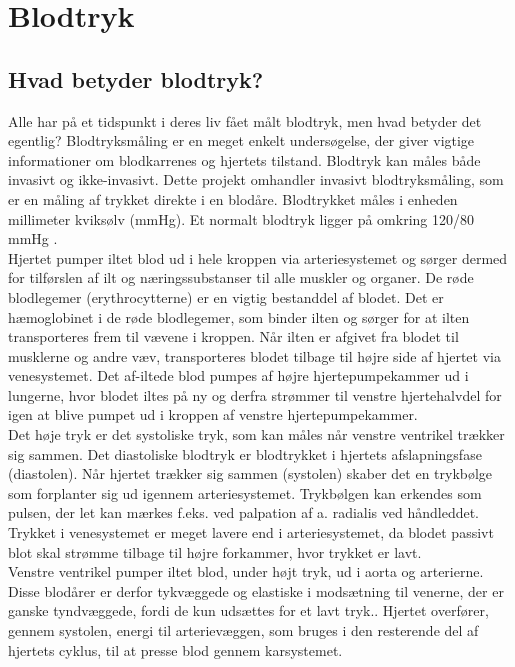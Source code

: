 \chapter{Blodtryk}
\section{Hvad betyder blodtryk?} 
Alle har på et tidspunkt i deres liv fået målt blodtryk, men hvad betyder det egentlig?
Blodtryksmåling er en meget enkelt undersøgelse, der giver vigtige informationer om blodkarrenes og hjertets tilstand. Blodtryk kan måles både invasivt og ikke-invasivt. Dette projekt omhandler invasivt blodtryksmåling, som er en måling af trykket direkte i en blodåre. 
Blodtrykket måles i enheden millimeter kviksølv (mmHg). Et normalt blodtryk ligger på omkring 120/80 mmHg \cite{Blodtryk}. \\ 
Hjertet pumper iltet blod ud i hele kroppen via arteriesystemet og sørger dermed for tilførslen af ilt og næringssubstanser til alle muskler og organer. De røde blodlegemer (erythrocytterne) er en vigtig bestanddel af blodet. Det er hæmoglobinet i de røde blodlegemer, som binder ilten og sørger for at ilten transporteres frem til vævene i kroppen. Når ilten er afgivet fra blodet til musklerne og andre væv, transporteres blodet tilbage til højre side af hjertet via venesystemet. Det af-iltede blod pumpes af højre hjertepumpekammer ud i lungerne, hvor blodet iltes på ny og derfra strømmer til venstre hjertehalvdel for igen at blive pumpet ud i kroppen af venstre hjertepumpekammer. \\
Det høje tryk er det systoliske tryk, som kan måles når venstre ventrikel trækker sig sammen. Det diastoliske blodtryk er blodtrykket i hjertets afslapningsfase (diastolen). Når hjertet trækker sig sammen (systolen) skaber det en trykbølge som forplanter sig ud igennem arteriesystemet. Trykbølgen kan erkendes som pulsen, der let kan mærkes f.eks. ved palpation af a. radialis ved håndleddet. Trykket i venesystemet er meget lavere end i arteriesystemet, da blodet passivt blot skal strømme tilbage til højre forkammer, hvor trykket er lavt. \\
Venstre ventrikel pumper iltet blod, under højt tryk, ud i aorta og arterierne. Disse blodårer er derfor tykvæggede og elastiske i modsætning til venerne, der er ganske tyndvæggede, fordi de kun udsættes for et lavt tryk.. Hjertet overfører, gennem systolen, energi til arterievæggen, som bruges i den resterende del af hjertets cyklus, til at presse blod gennem karsystemet. 


